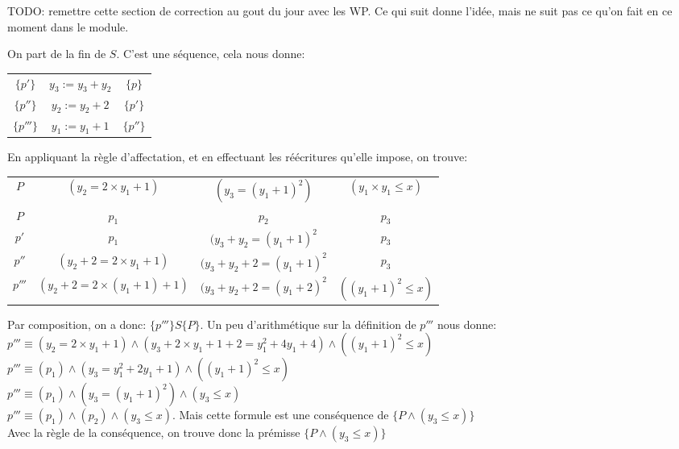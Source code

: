 \documentclass[10pt]{article}\usepackage[nu]{esial}
\begin{document}
\begin{Reponse}
  TODO: remettre cette section de correction au gout du jour avec les WP. Ce qui
  suit donne l'idée, mais ne suit pas ce qu'on fait en ce moment dans le module.

  On part de la fin de $S$. C'est une séquence, cela nous donne:
  \begin{center}
    \begin{tabular}{ccc}
      $\{p'\}$&$y_3:=y_3+y_2$&$\{p\}$\\
      $\{p''\}$&$y_2:=y_2+2$&$\{p'\}$\\
      $\{p'''\}$&$y_1:=y_1+1$&$\{p''\}$\\
    \end{tabular}
  \end{center}

  En appliquant la règle d'affectation, et en effectuant les réécritures
  qu'elle impose, on trouve:

  \begin{center}
    \begin{tabular}{c@{~$\equiv$~}c@{~$\wedge$~}c@{~$\wedge$~}c}
      $P$   &$(y_2=2\times y_1 + 1)$&$(y_3=(y_1+1)^2)$&$(y_1\times y_1 \leq x)$\\
      $P$   &$p_1$&$p_2$&$p_3$\\
      $p'$  &$p_1$&$(y_3+y_2=(y_1+1)^2$&$p_3$\\
      $p''$ &$(y_2+2=2\times y_1+1)$&$(y_3+y_2+2=(y_1+1)^2$&$p_3$\\
      $p'''$&$(y_2+2=2\times (y_1+1)+1)$&$(y_3+y_2+2=(y_1+2)^2$&$((y_1+1)^2 \leq x)$\\
    \end{tabular}
  \end{center}
  
  Par composition, on a donc: $\{p'''\} S \{P\}$. 
  Un peu d'arithmétique sur la définition de $p'''$ nous donne:
  $p'''\equiv (y_2=2\times y_1+1)\wedge(y_3+2\times y_1+1+2=y_1^2+4y_1+4)\wedge((y_1+1)^2 \leq x)$\\
  $p'''\equiv (p_1)\wedge(y_3=y_1^2+2y_1+1)\wedge((y_1+1)^2 \leq x)$ \\
  $p'''\equiv (p_1)\wedge(y_3=(y_1+1)^2)\wedge(y_3 \leq x)$ \\
  $p'''\equiv (p_1)\wedge(p_2)\wedge(y_3 \leq x)$. Mais cette formule est une
  conséquence de $\{P\wedge(y_3 \leq x)\}$ \\

  Avec la règle de la conséquence, on trouve donc la prémisse $\{P\wedge(y_3 \leq x)\}$ 
\end{Reponse}
\end{document}
